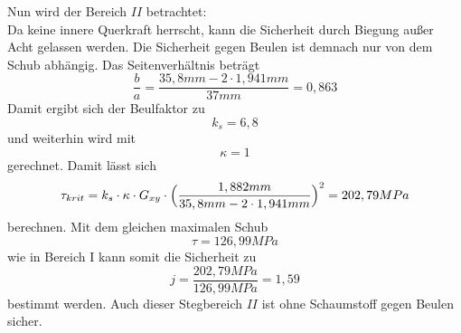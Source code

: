 \noindent Nun wird der Bereich $II$ betrachtet:\\
Da keine innere Querkraft herrscht, kann die Sicherheit durch Biegung außer Acht gelassen werden. Die Sicherheit gegen Beulen ist demnach nur von dem Schub abhängig.
Das Seitenverhältnis beträgt 
\begin{equation}
	\frac{b}{a}=\frac{35,8mm - 2\cdot 1,941mm}{37mm}=0,863
\end{equation}
Damit ergibt sich der Beulfaktor zu 
\begin{equation}
	k_{s}=6,8
\end{equation}
und weiterhin wird mit 
\begin{equation}
	\kappa = 1 
\end{equation}
gerechnet. Damit lässt sich 
\begin{equation}
	 \tau_{krit} = k_{s}\cdot \kappa\cdot G_{xy}\cdot \Bigl(\frac{1,882mm}{35,8mm-2\cdot 1,941mm}\Bigr)^{2}= 202,79 MPa
\end{equation}
berechnen. Mit dem gleichen maximalen Schub
\begin{equation}
	\tau=126,99 MPa
\end{equation}
 wie in Bereich I kann somit die Sicherheit zu 
 \begin{equation}
 	j=\frac{202,79MPa}{126,99MPa}=1,59
 \end{equation}
bestimmt werden. Auch dieser Stegbereich $II$ ist ohne Schaumstoff gegen Beulen sicher.\\

